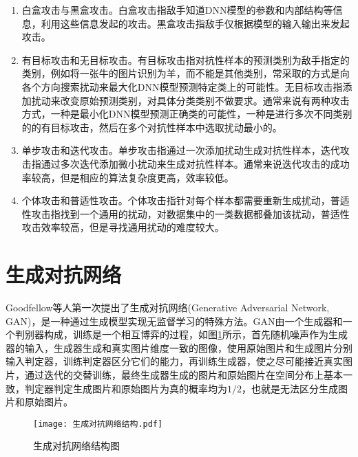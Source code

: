\begin{enumerate}
	\renewcommand{\labelenumi}{\theenumi)}
	\item 白盒攻击与黑盒攻击。白盒攻击指敌手知道DNN模型的参数和内部结构等信息，利用这些信息发起的攻击。黑盒攻击指敌手仅根据模型的输入输出来发起攻击。
	\item 有目标攻击和无目标攻击。有目标攻击指对抗性样本的预测类别为敌手指定的类别，例如将一张牛的图片识别为羊，而不能是其他类别，常采取的方式是向各个方向搜索扰动来最大化DNN模型预测特定类上的可能性。无目标攻击指添加扰动来改变原始预测类别，对具体分类类别不做要求。通常来说有两种攻击方式，一种是最小化DNN模型预测正确类的可能性，一种是进行多次不同类别的的有目标攻击，然后在多个对抗性样本中选取扰动最小的。
	\item 单步攻击和迭代攻击。单步攻击指通过一次添加扰动生成对抗性样本，迭代攻击指通过多次迭代添加微小扰动来生成对抗性样本。通常来说迭代攻击的成功率较高，但是相应的算法复杂度更高，效率较低。
	\item 个体攻击和普适性攻击。个体攻击指针对每个样本都需要重新生成扰动，普适性攻击指找到一个通用的扰动，对数据集中的一类数据都叠加该扰动，普适性攻击效率较高，但是寻找通用扰动的难度较大。
\end{enumerate}

\section{生成对抗网络}

Goodfellow等人\cite{goodfellow2014generative}第一次提出了生成对抗网络(Generative Adversarial Network, GAN)，是一种通过生成模型实现无监督学习的特殊方法。GAN由一个生成器和一个判别器构成，训练是一个相互博弈的过程，如图\ref{生成对抗网络结构图}所示，首先随机噪声作为生成器的输入，生成器生成和真实图片维度一致的图像，使用原始图片和生成图片分别输入判定器，训练判定器区分它们的能力，再训练生成器，使之尽可能接近真实图片，通过迭代的交替训练，最终生成器生成的图片和原始图片在空间分布上基本一致，判定器判定生成图片和原始图片为真的概率均为$1/2$，也就是无法区分生成图片和原始图片。

\begin{figure}[htbp]%
	\centering
	\texttt{[image: 生成对抗网络结构.pdf]}
	\setlength{\abovecaptionskip}{5mm} %
	\caption{生成对抗网络结构图}
	\label{生成对抗网络结构图}
\end {figure}

